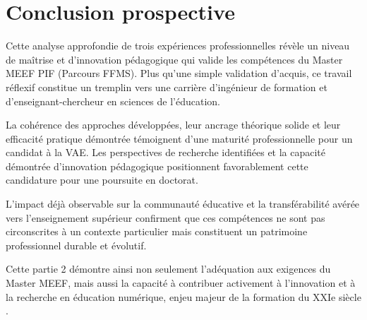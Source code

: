 \section{Conclusion prospective}

Cette analyse approfondie de trois expériences professionnelles révèle un niveau de maîtrise et d'innovation pédagogique qui valide les compétences du Master MEEF PIF (Parcours FFMS). Plus qu'une simple validation d'acquis, ce travail réflexif constitue un tremplin vers une carrière d'ingénieur de formation et d'enseignant-chercheur en sciences de l'éducation.

La cohérence des approches développées, leur ancrage théorique solide et leur efficacité pratique démontrée témoignent d'une maturité professionnelle pour un candidat à la VAE. Les perspectives de recherche identifiées et la capacité démontrée d'innovation pédagogique positionnent favorablement cette candidature pour une poursuite en doctorat.

L'impact déjà observable sur la communauté éducative et la transférabilité avérée vers l'enseignement supérieur confirment que ces compétences ne sont pas circonscrites à un contexte particulier mais constituent un patrimoine professionnel durable et évolutif.

Cette partie 2 démontre ainsi non seulement l'adéquation aux exigences du Master MEEF, mais aussi la capacité à contribuer activement à l'innovation et à la recherche en éducation numérique, enjeu majeur de la formation du XXIe siècle \parencite{competences_21_siecle,intelligence_artificielle_education}.
